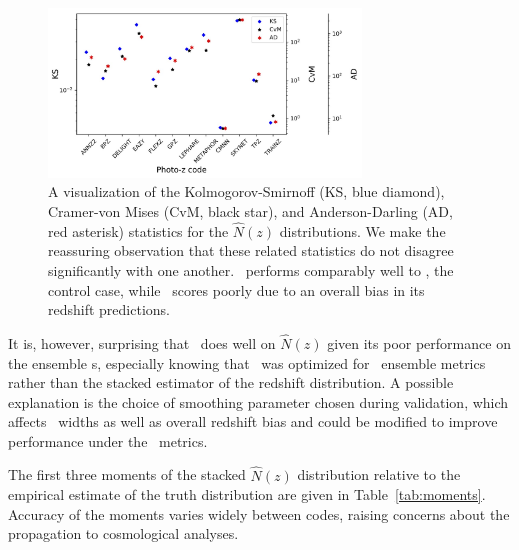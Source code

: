 \begin{figure}
\centering
\includegraphics[width=0.74\textwidth]{fig/KSvsCvMvsAD_NZ_withnull_jpg.jpg}
\caption{A visualization of the Kolmogorov-Smirnoff (KS, blue diamond), Cramer-von Mises (CvM, black star), and Anderson-Darling (AD, red asterisk) statistics for the $\hat{N}(z)$ distributions.
We make the reassuring observation that these related statistics do not disagree significantly with one another.
\cmnn\ performs comparably well to \trainz, the control case, while \skynet\ scores poorly due to an overall bias in its redshift predictions.}
\label{fig:nz_stats}
\end{figure}

It is, however, surprising that \tpz\ does well on $\hat{N}(z)$ given its poor performance on the ensemble \pzpdf s, especially knowing that \tpz\ was optimized for \pzpdf\ ensemble metrics rather than the stacked estimator of the redshift distribution.
A possible explanation is the choice of smoothing parameter chosen during validation, which affects \pzpdf\ widths as well as overall redshift bias and could be modified to improve performance under the \pzpdf\ metrics.

The first three moments of the stacked $\hat{N}(z)$ distribution relative to the empirical estimate of the truth distribution are given in Table~\ref{tab:moments}.
Accuracy of the moments varies widely between codes, raising concerns about the propagation to cosmological analyses.

